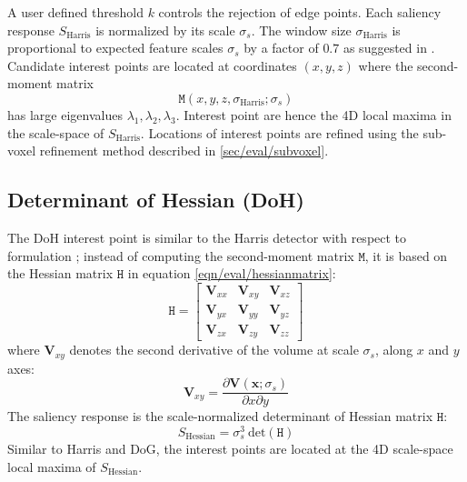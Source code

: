 A user defined threshold $k$ controls the rejection of edge points.
Each saliency response $S_\textrm{Harris}$ is normalized by its scale $\sigma_s$. The window size $\sigma_\textrm{Harris}$ is proportional to expected feature scales $\sigma_s$ by a factor of $0.7$ as suggested in \cite{Mikolajczyk2004}. 
Candidate interest points are located at coordinates $(x,y,z)$ where the second-moment matrix 
\begin{equation}
\mathtt{M}(x,y,z,\sigma_\textrm{Harris};\sigma_s)
\end{equation} 
has large eigenvalues $\lambda_1, \lambda_2, \lambda_3$. Interest point are hence the 4D local maxima in the scale-space of $S_{\textrm{Harris}}$. Locations of interest points are refined using the sub-voxel refinement method described in \ref{sec/eval/subvoxel}.

\subsection{Determinant of Hessian (DoH)}
\label{sec/eval/doh}
The DoH interest point is similar to the Harris detector with respect to formulation \cite{Lindeberg1998}; instead of computing the second-moment matrix $\mathtt{M}$, it is based on the Hessian matrix $\mathtt{H}$ in equation \ref{eqn/eval/hessianmatrix}:
\begin{equation}
\mathtt{H} = 
\left[
\begin{array}{ccc}
\mathbf{V}_{xx} & \mathbf{V}_{xy} & \mathbf{V}_{xz} \\
\mathbf{V}_{yx} & \mathbf{V}_{yy} & \mathbf{V}_{yz} \\
\mathbf{V}_{zx} & \mathbf{V}_{zy} & \mathbf{V}_{zz} 
\end{array}
\right]
\label{eqn/eval/hessianmatrix}
\end{equation}
where $\mathbf{V}_{xy}$ denotes the second derivative of the volume at scale $\sigma_s$, along $x$ and $y$ axes: 
\begin{equation}
\mathbf{V}_{xy} = \frac{\partial \mathbf{V}(\mathbf{x};\sigma_s)}{\partial x \partial y}
\label{eqn/eval/hessiandiverative}
\end{equation}
The saliency response is the scale-normalized determinant of Hessian matrix $\mathtt{H}$:
\begin{equation}
S_{\textrm{Hessian}} = \sigma^3_s \:\mathrm{det}(\mathtt{H})
\label{eqn/eval/hessiansaliency}
\end{equation}
Similar to Harris and DoG, the interest points are located at the 4D scale-space local maxima of $S_\textrm{Hessian}$.

